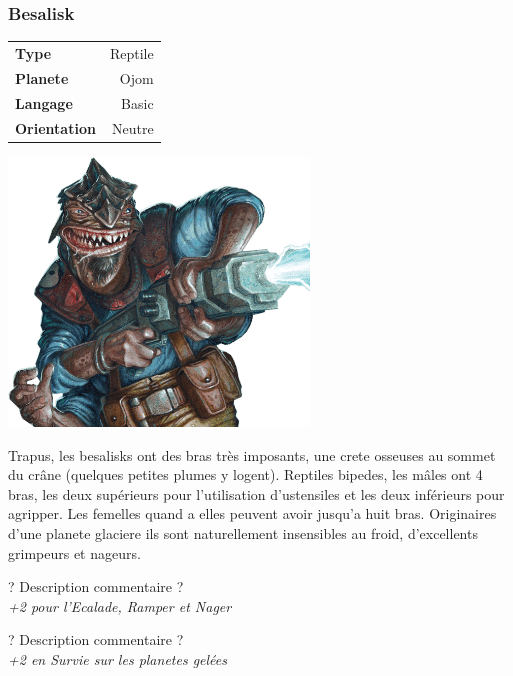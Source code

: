 \subsubsection{Besalisk}
\vspace{-2\baselineskip}
\begin{flushright}	
    \begin{tabular}{|l|r|}
        \textbf{Type} & Reptile \\
        \textbf{Planete} & Ojom \\
        \textbf{Langage} & Basic \\
        \textbf{Orientation} & Neutre\\
    \end{tabular}
\end{flushright}
\vspace{-3\baselineskip}
\includegraphics[width=8cm]{img/personnages/races/besalisk.png}
 
Trapus, les besalisks ont des bras très imposants, une crete osseuses au sommet du crâne (quelques petites plumes y logent). Reptiles bipedes, les mâles ont 4 bras, les deux supérieurs pour l’utilisation d’ustensiles et les deux inférieurs pour agripper. Les femelles quand a elles peuvent avoir jusqu’a huit bras. Originaires d’une planete glaciere ils sont naturellement insensibles au froid, d’excellents grimpeurs et nageurs. 

\begin{description}[align=left]
\item [A bras le corps]
    ? Description commentaire ?\\
    \emph{+2 pour l’Ecalade, Ramper et Nager} 

\item [Pas frilleux]
    ? Description commentaire ?\\
    \emph{+2 en Survie sur les planetes gelées}
\end{description}
